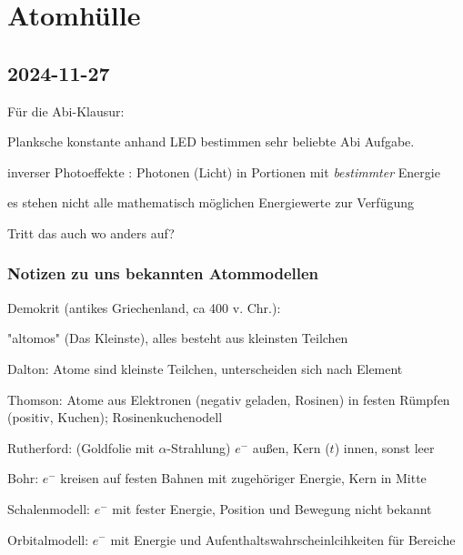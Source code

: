 \chapter{Atomhülle}

\section{2024-11-27}

\startframedtipp
Für die Abi-Klausur:

Planksche konstante anhand LED bestimmen sehr beliebte Abi Aufgabe.
\stopframedtipp

\startitemize[packed]
\item inverser Photoeffekte : Photonen (Licht) in Portionen mit {\em bestimmter} Energie
\item es stehen nicht alle mathematisch möglichen Energiewerte zur Verfügung
\item Tritt das auch wo anders auf?
\stopitemize

\subsection{Notizen zu uns bekannten Atommodellen}

\startitemize[packed]
\item Demokrit (antikes Griechenland, ca 400 v. Chr.):
\startitemize[packed]
\item "altomos" (Das Kleinste), alles besteht aus kleinsten Teilchen
\stopitemize
\item Dalton: Atome sind kleinste Teilchen, unterscheiden sich nach Element
\item Thomson: Atome aus Elektronen (negativ geladen, Rosinen) in festen Rümpfen (positiv, Kuchen); Rosinenkuchenodell
\item Rutherford: (Goldfolie mit $\alpha$-Strahlung) $e^-$ außen, Kern ($t$) innen, sonst leer
\item Bohr: $e^-$ kreisen auf festen Bahnen mit zugehöriger Energie, Kern in Mitte
\item Schalenmodell: $e^-$ mit fester Energie, Position und Bewegung nicht bekannt
\item Orbitalmodell: $e^-$ mit Energie und Aufenthaltswahrscheinlcihkeiten für Bereiche
\stopitemize


